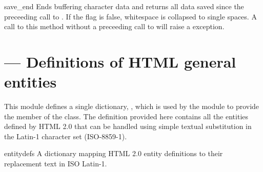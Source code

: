 \begin{methoddesc}{save_end}{}
Ends buffering character data and returns all data saved since the
preceeding call to .  If the  flag is
false, whitespace is collapsed to single spaces.  A call to this
method without a preceeding call to  will raise a
 exception.
\end{methoddesc}



\section{ ---
         Definitions of HTML general entities}


This module defines a single dictionary, , which is
used by the  module to provide the
 member of the  class.  The
definition provided here contains all the entities defined by HTML 2.0 
that can be handled using simple textual substitution in the Latin-1
character set (ISO-8859-1).


\begin{datadesc}{entitydefs}
  A dictionary mapping HTML 2.0 entity definitions to their
  replacement text in ISO Latin-1.
\end{datadesc}
